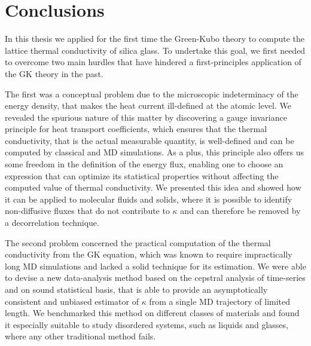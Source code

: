 \chapter{Conclusions}  \label{ch:conclusions}

In this thesis we applied for the first time the \abinitio Green-Kubo theory to compute the lattice thermal conductivity of silica glass. 
To undertake this goal, we first needed to overcome two main hurdles that have hindered a first-principles application of the GK theory in the past. 

The first was a conceptual problem due to the microscopic indeterminacy of the energy density, that makes the heat current ill-defined at the atomic level. 
We revealed the spurious nature of this matter by discovering a gauge invariance principle for heat transport coefficients, which ensures that the thermal conductivity, that is the actual measurable quantity, is well-defined and can be computed by classical and \abinitio MD simulations. 
As a plus, this principle also offers us some freedom in the definition of the energy flux, enabling one to choose an expression that can optimize its statistical properties without affecting the computed value of thermal conductivity. We presented this idea and showed how it can be applied to molecular fluids and solids, where it is possible to identify non-diffusive fluxes that do not contribute to $\kappa$ and can therefore be removed by a decorrelation technique.

The second problem concerned the practical computation of the thermal conductivity from the GK equation, which was known to require impractically long MD simulations and lacked a solid technique for its estimation. 
We were able to devise a new data-analysis method based on the cepstral analysis of time-series and on sound statistical basis, that is able to provide an asymptotically consistent and unbiased estimator of $\kappa$ from a single MD trajectory of limited length. 
We benchmarked this method on different classes of materials and found it especially suitable to study disordered systems, such as liquids and glasses, where any other traditional method fails. 

